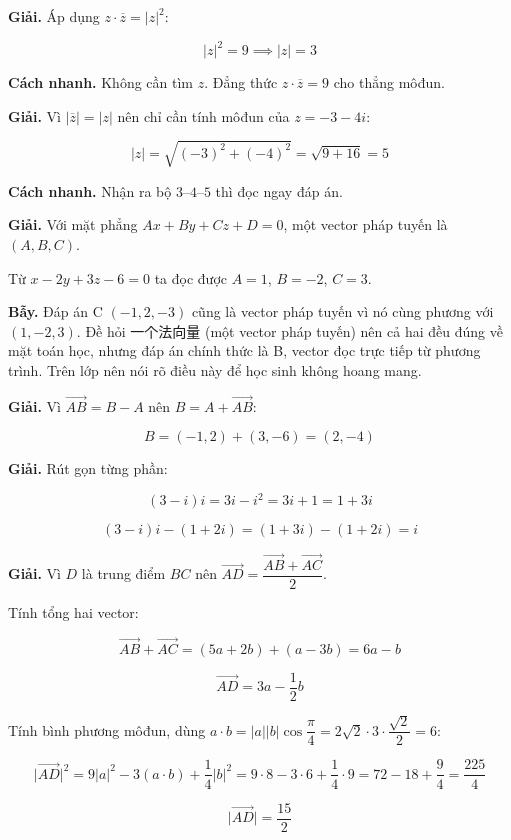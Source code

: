 \documentclass[11pt, a4paper]{article}
\begin{document}
\begin{dapan}[4 — Đáp án C]
\textbf{Giải.} Áp dụng $z \cdot \overline{z} = \lvert z \rvert^2$:

$$\lvert z \rvert^2 = 9 \implies \lvert z \rvert = 3$$

\textbf{Cách nhanh.} Không cần tìm $z$. Đẳng thức $z \cdot \overline{z} = 9$ cho thẳng môđun.
\end{dapan}

\begin{dapan}[5 — Đáp án C]
\textbf{Giải.} Vì $\lvert \overline{z} \rvert = \lvert z \rvert$ nên chỉ cần tính môđun của $z = -3 - 4i$:

$$\lvert z \rvert = \sqrt{(-3)^2 + (-4)^2} = \sqrt{9 + 16} = 5$$

\textbf{Cách nhanh.} Nhận ra bộ $3$–$4$–$5$ thì đọc ngay đáp án.
\end{dapan}

\begin{dapan}[6 — Đáp án B]
\textbf{Giải.} Với mặt phẳng $Ax + By + Cz + D = 0$, một vector pháp tuyến là $(A, B, C)$.

Từ $x - 2y + 3z - 6 = 0$ ta đọc được $A = 1$, $B = -2$, $C = 3$.

\textbf{Bẫy.} Đáp án C $(-1, 2, -3)$ cũng là vector pháp tuyến vì nó cùng phương với $(1,-2,3)$. Đề hỏi 一个法向量 (một vector pháp tuyến) nên cả hai đều đúng về mặt toán học, nhưng đáp án chính thức là B, vector đọc trực tiếp từ phương trình. Trên lớp nên nói rõ điều này để học sinh không hoang mang.
\end{dapan}

\begin{dapan}[7 — Đáp án B]
\textbf{Giải.} Vì $\overrightarrow{AB} = B - A$ nên $B = A + \overrightarrow{AB}$:

$$B = (-1, 2) + (3, -6) = (2, -4)$$
\end{dapan}

\begin{dapan}[8 — Đáp án C]
\textbf{Giải.} Rút gọn từng phần:

$$(3 - i)i = 3i - i^2 = 3i + 1 = 1 + 3i$$

$$(3-i)i - (1 + 2i) = (1 + 3i) - (1 + 2i) = i$$
\end{dapan}

\begin{dapan}[9 — Đáp án A]
\textbf{Giải.} Vì $D$ là trung điểm $BC$ nên $\overrightarrow{AD} = \dfrac{\overrightarrow{AB} + \overrightarrow{AC}}{2}$.

Tính tổng hai vector:

$$\overrightarrow{AB} + \overrightarrow{AC} = (5a + 2b) + (a - 3b) = 6a - b$$

$$\overrightarrow{AD} = 3a - \frac{1}{2}b$$

Tính bình phương môđun, dùng $a \cdot b = \lvert a \rvert \lvert b \rvert \cos\dfrac{\pi}{4} = 2\sqrt{2} \cdot 3 \cdot \dfrac{\sqrt{2}}{2} = 6$:

$$\lvert \overrightarrow{AD} \rvert^2 = 9\lvert a \rvert^2 - 3(a \cdot b) + \frac{1}{4}\lvert b \rvert^2 = 9 \cdot 8 - 3 \cdot 6 + \frac{1}{4} \cdot 9 = 72 - 18 + \frac{9}{4} = \frac{225}{4}$$

$$\lvert \overrightarrow{AD} \rvert = \frac{15}{2}$$
\end{dapan}
\end{document}
